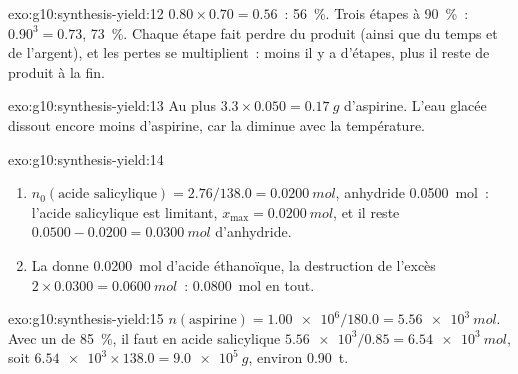 \begin{solution}{exo:g10:synthesis-yield:12}
$0.80 \times 0.70 = 0.56$~: \qty{56}{\percent}. Trois étapes à
\qty{90}{\percent}~: $0.90^3 = 0.73$, \qty{73}{\percent}. Chaque étape
fait perdre du produit (ainsi que du temps et de l'argent), et les pertes
se multiplient~: moins il y a d'étapes, plus il reste de produit à la
fin.
\end{solution}

\begin{solution}{exo:g10:synthesis-yield:13}
Au plus $3.3 \times 0.050 = \qty{0.17}{g}$ d'aspirine. L'eau glacée
dissout encore moins d'aspirine, car la  diminue avec la
température.
\end{solution}

\begin{solution}{exo:g10:synthesis-yield:14}
\begin{enumerate}
  \item $n_0(\text{acide salicylique}) = 2.76 / 138.0 = \qty{0.0200}{mol}$,
        anhydride \qty{0.0500}{mol}~: l'acide salicylique est limitant,
        $x_{\max} = \qty{0.0200}{mol}$, et il reste $0.0500 - 0.0200 =
        \qty{0.0300}{mol}$ d'anhydride.
  \item La  donne \qty{0.0200}{mol} d'acide éthanoïque, la
        destruction de l'excès $2 \times 0.0300 = \qty{0.0600}{mol}$~:
        \qty{0.0800}{mol} en tout.
\end{enumerate}
\end{solution}

\begin{solution}{exo:g10:synthesis-yield:15}
$n(\text{aspirine}) = \num{1.00e6} / 180.0 = \qty{5.56e3}{mol}$. Avec un
 de \qty{85}{\percent}, il faut en acide salicylique
$\num{5.56e3} / 0.85 = \qty{6.54e3}{mol}$, soit
$\num{6.54e3} \times 138.0 = \qty{9.0e5}{g}$, environ \qty{0.90}{t}.
\end{solution}

